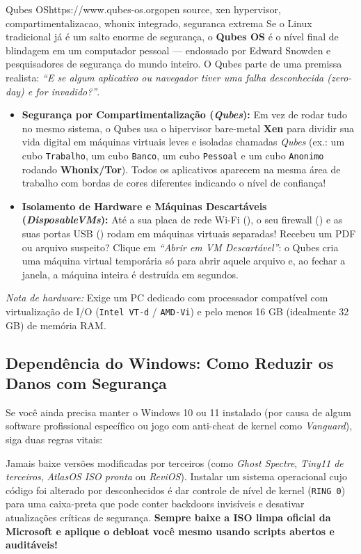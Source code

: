 \documentclass{pousadaguide}
\begin{document}
\begin{ferramenta}[goat,logo=qubes]{Qubes OS}{https://www.qubes-os.org}{open source, xen hypervisor, compartimentalizacao, whonix integrado, seguranca extrema}
Se o Linux tradicional já é um salto enorme de segurança, o \textbf{Qubes OS} é o nível final de blindagem em um computador pessoal — endossado por Edward Snowden e pesquisadores de segurança do mundo inteiro. O Qubes parte de uma premissa realista: \emph{``E se algum aplicativo ou navegador tiver uma falha desconhecida (zero-day) e for invadido?''}.
\begin{itemize}
  \item \textbf{Segurança por Compartimentalização (\emph{Qubes}):} Em vez de rodar tudo no mesmo sistema, o Qubes usa o hipervisor bare-metal \textbf{Xen} para dividir sua vida digital em máquinas virtuais leves e isoladas chamadas \emph{Qubes} (ex.: um cubo \texttt{Trabalho}, um cubo \texttt{Banco}, um cubo \texttt{Pessoal} e um cubo \texttt{Anonimo} rodando \textbf{Whonix/Tor}). Todos os aplicativos aparecem na mesma área de trabalho com bordas de cores diferentes indicando o nível de confiança!
  \item \textbf{Isolamento de Hardware e Máquinas Descartáveis (\emph{DisposableVMs}):} Até a sua placa de rede Wi-Fi (), o seu firewall () e as suas portas USB () rodam em máquinas virtuais separadas! Recebeu um PDF ou arquivo suspeito? Clique em \emph{``Abrir em VM Descartável''}: o Qubes cria uma máquina virtual temporária só para abrir aquele arquivo e, ao fechar a janela, a máquina inteira é destruída em segundos.
\end{itemize}
\emph{Nota de hardware:} Exige um PC dedicado com processador compatível com virtualização de I/O (\texttt{Intel VT-d} / \texttt{AMD-Vi}) e pelo menos 16 GB (idealmente 32 GB) de memória RAM. 
\end{ferramenta}

\subsection{Dependência do Windows: Como Reduzir os Danos com Segurança}

Se você ainda precisa manter o Windows 10 ou 11 instalado (por causa de algum software profissional específico ou jogo com anti-cheat de kernel como \emph{Vanguard}), siga duas regras vitais:

\begin{perigo}
Jamais baixe versões modificadas por terceiros (como \emph{Ghost Spectre}, \emph{Tiny11 de terceiros}, \emph{AtlasOS ISO pronta} ou \emph{ReviOS}). Instalar um sistema operacional cujo código foi alterado por desconhecidos é dar controle de nível de kernel (\texttt{RING 0}) para uma caixa-preta que pode conter backdoors invisíveis e desativar atualizações críticas de segurança. \textbf{Sempre baixe a ISO limpa oficial da Microsoft e aplique o debloat você mesmo usando scripts abertos e auditáveis!}
\end{perigo}
\end{document}
